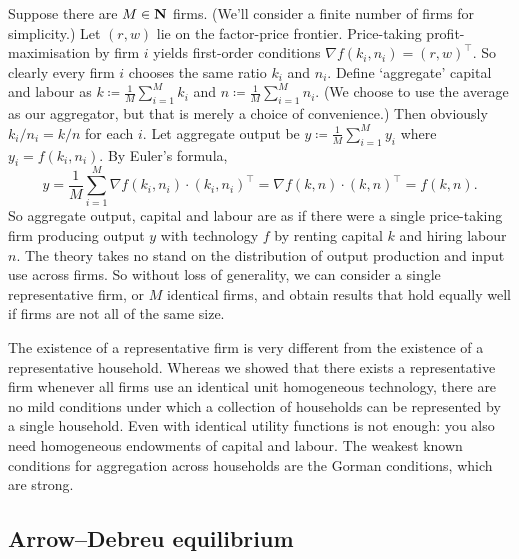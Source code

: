 \documentclass[11pt,letterpaper,reqno,oneside]{article}
\begin{document}
Suppose there are $M \in \mathbf{N}$ firms. (We'll consider a finite number of firms for simplicity.) Let $(r,w)$ lie on the factor-price frontier. Price-taking profit-maximisation by firm $i$ yields first-order conditions $\nabla f( k_i, n_i ) = (r,w)^\top$. So clearly every firm $i$ chooses the same ratio $k_i$ and $n_i$. Define `aggregate' capital and labour as $k \coloneqq \frac{1}{M} \sum_{i=1}^M k_i$ and $n \coloneqq \frac{1}{M} \sum_{i=1}^M n_i$. (We choose to use the average as our aggregator, but that is merely a choice of convenience.) Then obviously $k_i/n_i = k/n$ for each $i$. Let aggregate output be $y \coloneqq \frac{1}{M} \sum_{i=1}^M y_i$ where $y_i = f(k_i,n_i)$. By Euler's formula,
%
\begin{equation*}
	y 
	= \frac{1}{M} \sum_{i=1}^M \nabla f(k_i,n_i) \cdot (k_i,n_i)^\top
	= \nabla f(k,n) \cdot (k,n)^\top
	= f(k,n) .
\end{equation*}
%
So aggregate output, capital and labour are as if there were a single price-taking firm producing output $y$ with technology $f$ by renting capital $k$ and hiring labour $n$. The theory takes no stand on the distribution of output production and input use across firms. So without loss of generality, we can consider a single representative firm, or $M$ identical firms, and obtain results that hold equally well if firms are not all of the same size.

The existence of a representative firm is very different from the existence of a representative household. Whereas we showed that there exists a representative firm whenever all firms use an identical unit homogeneous technology, there are no mild conditions under which a collection of households can be represented by a single household. Even with identical utility functions is not enough: you also need homogeneous endowments of capital and labour. The weakest known conditions for aggregation across households are the Gorman conditions, which are strong.



\subsection{Arrow--Debreu equilibrium}
\label{sec:12Oct2015:Arrow--Debreu_equilibrium}
\end{document}
